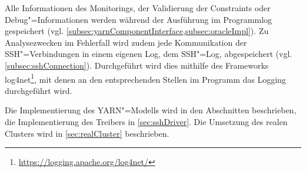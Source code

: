 Alle Informationen des Monitorings, der Validierung der Constraints oder Debug"=Informationen werden während der Ausführung im Programmlog gespeichert (vgl. \cref{subsec:yarnComponentInterface,subsec:oracleImpl}).
Zu Analysezwecken im Fehlerfall wird zudem jede Kommunikation der SSH"=Verbindungen in einem eigenen Log, dem SSH"=Log, abgespeichert (vgl. \cref{subsec:sshConnection}).
Durchgeführt wird dies mithilfe des Frameworks log4net\footnote{\url{https://logging.apache.org/log4net/}}, mit denen an den entsprechenden Stellen im Programm das Logging durchgeführt wird.

Die Implementierung des YARN"=Modells wird in den Abschnitten  beschrieben, die Implementierung des Treibers in \cref{sec:sshDriver}.
Die Umsetzung des realen Clusters wird in \cref{sec:realCluster} beschrieben.
